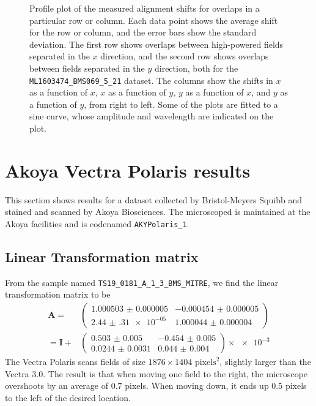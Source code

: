 \documentclass{article}
\newcommand{\matrixbold}[1]{\mathbf{#1}}
\begin{document}
\begin{figure}[ht]
\begin{subfigure}{0.24\linewidth}
		\caption{}
		\label{fig:sinewave4yyBMS}
	\end{subfigure}
	\caption{Profile plot of the measured alignment shifts for overlaps in a particular row or column.  Each data point shows the average shift for the row or column, and the error bars show the standard deviation.  The first row shows overlaps between high-powered fields separated in the $x$ direction, and the second row shows overlaps between fields separated in the $y$ direction, both for the \texttt{ML1603474\_BMS069\_5\_21} dataset.  The columns show the shifts in $x$ as a function of $x$, $x$ as a function of $y$, $y$ as a function of $x$, and $y$ as a function of $y$, from right to left.  Some of the plots are fitted to a sine curve, whose amplitude and wavelength are indicated on the plot.}
	\label{fig:sinewavesBMS}
\end{figure}

\clearpage

\section{Akoya Vectra Polaris results}

This section shows results for a dataset collected by Bristol-Meyers Squibb and stained and scanned by Akoya Biosciences.  The microscoped is maintained at the Akoya facilities and is codenamed \texttt{AKYPolaris\_1}.

\subsection{Linear Transformation matrix}

From the sample named \texttt{TS19\_0181\_A\_1\_3\_BMS\_MITRE}, we find the linear transformation matrix to be
\begin{align}
\matrixbold{A}=&\begin{pmatrix}
\num{1.000503(5)} &
\num{-0.000454(5)} \\ 
\num{2.44(31)e-05} &
\num{1.000044(4)}
\end{pmatrix} \\
=\matrixbold{I} + &\begin{pmatrix}
\num{0.503(5)} &
\num{-0.454(5)} \\
\num{0.0244(31)} &
\num{0.044(4)}
\end{pmatrix} \times \num{e-3}
\label{eq:Amatrix_TS18_0541_BMS_MITRE}
\end{align}
The Vectra Polaris scans fields of size $1876\times1404$ $\text{pixels}^2$, slightly larger than the Vectra 3.0.  The result is that when moving one field to the right, the microscope overshoots by an average of $0.7$ pixels.  When moving down, it ends up $0.5$ pixels to the left of the desired location.
\end{document}
